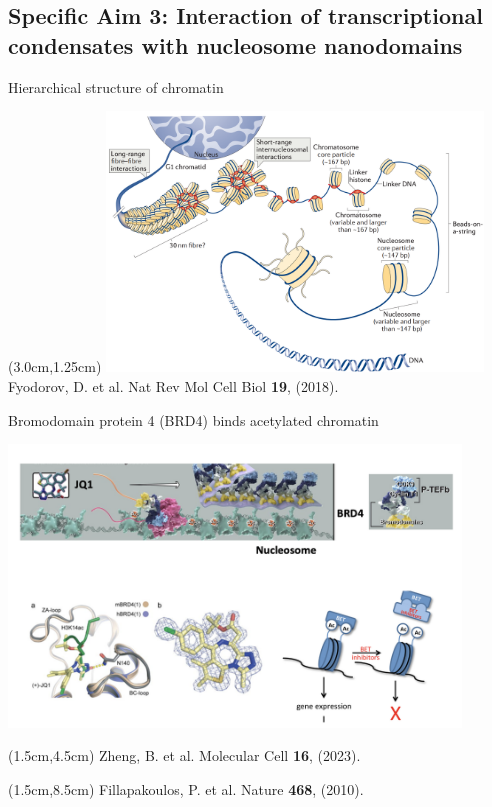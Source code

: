 \documentclass{beamer}					%
\begin{document}
\subsection{Specific Aim 3: Interaction of transcriptional condensates with nucleosome nanodomains}

\begin{frame}{Hierarchical structure of chromatin}

\begin{textblock*}{10cm}(3.0cm,1.25cm)
\includegraphics[width=10cm]{../../dissertation/dissertation/media/Chromatin}
\\
\vspace{0.4cm}
Fyodorov, D. et al. Nat Rev Mol Cell Biol \textbf{19}, (2018).
\end{textblock*}

\end{frame}

\begin{frame}{Bromodomain protein 4 (BRD4) binds acetylated chromatin}

\includegraphics[width=12cm]{../../dissertation/dissertation/media/Epigenetic}

\begin{textblock*}{10cm}(1.5cm,4.5cm)
Zheng, B. et al. Molecular Cell \textbf{16}, (2023).
\end{textblock*}

\begin{textblock*}{10cm}(1.5cm,8.5cm)
Fillapakoulos, P. et al. Nature \textbf{468}, (2010).
\end{textblock*}

\end{frame}
\end{document}
